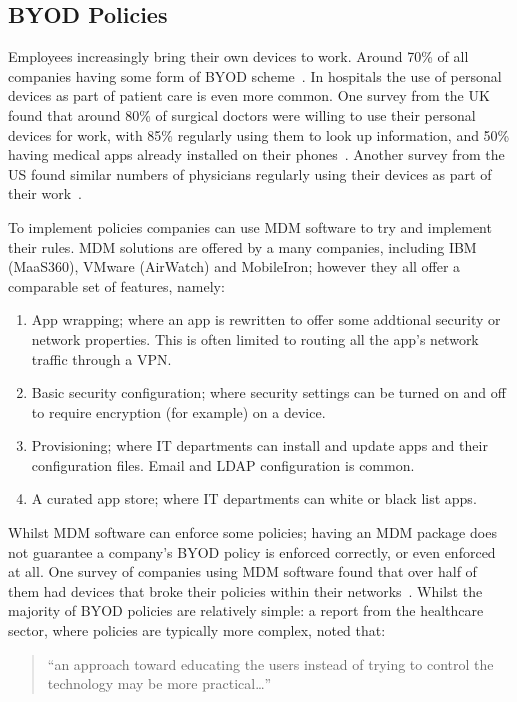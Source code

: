 \documentclass[a4paper]{scrartcl}
\begin{document}
\subsection{BYOD Policies}
\label{sec:byod}

Employees increasingly bring their own devices to work. Around 70\% of all
companies having some form of \ac{BYOD} scheme~\cite{schulze_byod_2016}. In
hospitals the use of personal devices as part of patient care is even more
common. One survey from the UK found that around 80\% of surgical doctors were
willing to use their personal devices for work, with 85\% regularly using them
to look up information, and 50\% having medical apps already installed on their
phones~\cite{patel_uk_2015}. Another survey from the US found similar numbers of
physicians regularly using their devices as part of their
work~\cite{moyer_managing_2013}.

To implement policies companies can use \ac{MDM} software to try and implement
their rules.  \ac{MDM} solutions are offered by a many companies, including IBM
(MaaS360), VMware (AirWatch) and MobileIron; however they all offer a
comparable set of features, namely:
\begin{enumerate}
\item App wrapping; where an app is rewritten to offer some addtional security
  or network properties. This is often limited to routing all the app's
  network traffic through a VPN.
\item Basic security configuration; where security settings can be turned on and
  off to require encryption (for example) on a device.
\item Provisioning; where IT departments can install and update apps and
  their configuration files. Email and LDAP configuration is common.
\item A curated app store; where IT departments can white or black list apps.
\end{enumerate}


Whilst \ac{MDM} software can enforce some policies; having an \ac{MDM} package
does not guarantee a company's BYOD policy is enforced correctly, or even
enforced at all. One survey of companies using \ac{MDM} software found that over
half of them had devices that broke their policies within their
networks~\cite{mobileiron_security_labs_q4_2015}. Whilst the majority of BYOD
policies are relatively simple: a report from the healthcare sector, where
policies are typically more complex, noted that:

\begin{quote}
  ``an approach toward educating the users instead of trying to control the
  technology may be more practical\ldots''~\cite{moyer_managing_2013}
\end{quote}
\end{document}
